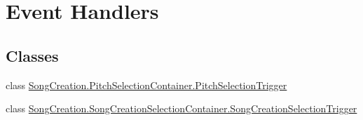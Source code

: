 \hypertarget{group___s_c_handlers}{}\section{Event Handlers}
\label{group___s_c_handlers}
\subsection*{Classes}
\begin{DoxyCompactItemize}
\item 
class \hyperlink{group___s_c_handlers_class_song_creation_1_1_pitch_selection_container_1_1_pitch_selection_trigger}{Song\+Creation.\+Pitch\+Selection\+Container.\+Pitch\+Selection\+Trigger}
\item 
class \hyperlink{group___s_c_handlers_class_song_creation_1_1_song_creation_selection_container_1_1_song_creation_selection_trigger}{Song\+Creation.\+Song\+Creation\+Selection\+Container.\+Song\+Creation\+Selection\+Trigger}
\end{DoxyCompactItemize}
